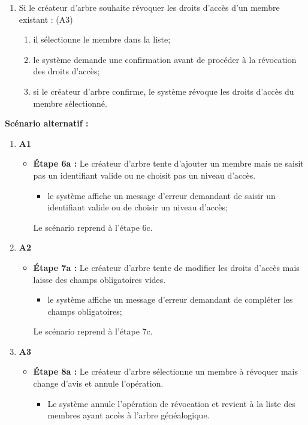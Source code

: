 \begin{enumerate}
  \item Si le créateur d'arbre souhaite révoquer les droits d'accès d'un membre existant : (A3)
    \begin{enumerate}
      \item il sélectionne le membre dans la liste;
      \item le système demande une confirmation avant de procéder à la révocation des droits d'accès;
      \item si le créateur d'arbre confirme, le système révoque les droits d'accès du membre sélectionné.
    \end{enumerate}

\end{enumerate}

\textbf{Scénario alternatif :}

\begin{enumerate}
    \item \textbf{A1}
    \begin{itemize}
        \item \textbf{Étape 6a :} Le créateur d'arbre tente d'ajouter un membre
          mais ne saisit pas un identifiant valide ou ne choisit pas un niveau d'accès.
        \begin{itemize}
            \item le système affiche un message d'erreur demandant de saisir un
              identifiant valide ou de choisir un niveau d'accès;
        \end{itemize}
        Le scénario reprend à l'étape 6c.
    \end{itemize}

    \item \textbf{A2}
    \begin{itemize}
        \item \textbf{Étape 7a :} Le créateur d'arbre tente de modifier les droits
          d'accès mais laisse des champs obligatoires vides.
        \begin{itemize}
            \item le système affiche un message d'erreur demandant de compléter les champs obligatoires;
        \end{itemize}
        Le scénario reprend à l'étape 7c.
    \end{itemize}

    \item \textbf{A3}
    \begin{itemize}
        \item \textbf{Étape 8a :} Le créateur d'arbre sélectionne un membre à
          révoquer mais change d'avis et annule l'opération.
        \begin{itemize}
            \item Le système annule l'opération de révocation et revient à la
              liste des membres ayant accès à l'arbre généalogique.
        \end{itemize}
    \end{itemize}

\end{enumerate}

